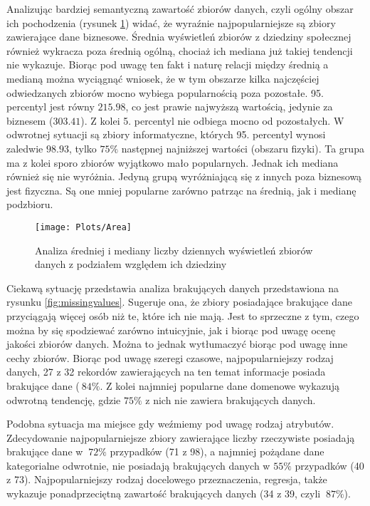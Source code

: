Analizując bardziej semantyczną zawartość zbiorów danych, czyli ogólny obszar ich pochodzenia (rysunek \ref{fig:area}) widać, że wyraźnie najpopularniejsze są zbiory zawierające dane biznesowe.
Średnia wyświetleń zbiorów z dziedziny społecznej również wykracza poza średnią ogólną, chociaż ich mediana już takiej tendencji nie wykazuje.
Biorąc pod uwagę ten fakt i naturę relacji między średnią a medianą można wyciągnąć wniosek, że w tym obszarze kilka najczęściej odwiedzanych zbiorów mocno wybiega popularnością poza pozostałe.
95. percentyl jest równy \(215.98\), co jest prawie najwyższą wartością, jedynie za biznesem (\(303.41\)).
Z kolei 5. percentyl nie odbiega mocno od pozostałych.
W odwrotnej sytuacji są zbiory informatyczne, których 95. percentyl wynosi zaledwie \(98.93\), tylko \(75\%\) następnej najniższej wartości (obszaru fizyki).
Ta grupa ma z kolei sporo zbiorów wyjątkowo mało popularnych.
Jednak ich mediana również się nie wyróżnia.
Jedyną grupą wyróżniającą się z innych poza biznesową jest fizyczna.
Są one mniej popularne zarówno patrząc na średnią, jak i medianę podzbioru.

\begin{figure}[ht]
  \texttt{[image: Plots/Area]}
  \caption{Analiza średniej i mediany liczby dziennych wyświetleń zbiorów danych z podziałem względem ich dziedziny}
  \label{fig:area}
\end{figure}

Ciekawą sytuację przedstawia analiza brakujących danych przedstawiona na rysunku \ref{fig:missingvalues}.
Sugeruje ona, że zbiory posiadające brakujące dane przyciągają więcej osób niż te, które ich nie mają.
Jest to sprzeczne z tym, czego można by się spodziewać zarówno intuicyjnie, jak i biorąc pod uwagę ocenę jakości zbiorów danych.
Można to jednak wytłumaczyć biorąc pod uwagę inne cechy zbiorów.
Biorąc pod uwagę szeregi czasowe, najpopularniejszy rodzaj danych, 27 z 32 rekordów zawierających na ten temat informacje posiada brakujące dane (\(~84\%\).
Z kolei najmniej popularne dane domenowe wykazują odwrotną tendencję, gdzie \(75\%\) z nich nie zawiera brakujących danych.

Podobna sytuacja ma miejsce gdy weźmiemy pod uwagę rodzaj atrybutów.
Zdecydowanie najpopularniejsze zbiory zawierające liczby rzeczywiste posiadają brakujące dane w \(~72\%\) przypadków (71 z 98), a najmniej pożądane dane kategorialne odwrotnie, nie posiadają brakujących danych w \(55\%\) przypadków (40 z 73).
Najpopularniejszy rodzaj docelowego przeznaczenia, regresja, także wykazuje ponadprzeciętną zawartość brakujących danych (34 z 39, czyli \(~87\%\)).

